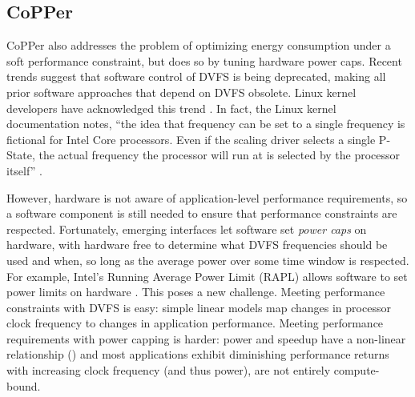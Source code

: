 \subsection{CoPPer}

CoPPer also addresses the problem of optimizing energy consumption under a soft performance constraint, but does so by tuning hardware power caps.
Recent trends suggest that software control of DVFS is being deprecated, making all prior software approaches that depend on DVFS obsolete.
Linux kernel developers have acknowledged this trend \cite{lwn602479}.
In fact, the Linux kernel documentation notes, ``the idea that frequency can be set to a single frequency is fictional for Intel Core processors. Even if the scaling driver selects a single P-State, the actual frequency the processor will run at is selected by the processor itself'' \cite{KernelPstate}.

However, hardware is not aware of application-level performance requirements, so a software component is still needed to ensure that performance constraints are respected.
Fortunately, emerging interfaces let software set \emph{power caps} on hardware, with hardware free to determine what DVFS frequencies should be used and when, so long as the average power over some time window is respected.
For example, Intel's Running Average Power Limit (RAPL) allows software to set power limits on hardware \cite{RAPL}.
This poses a new challenge.
Meeting performance constraints with DVFS is easy: simple linear models map changes in processor clock frequency to changes in application performance.
Meeting performance requirements with power capping is harder: power and speedup have a non-linear relationship () and most applications exhibit diminishing performance returns with increasing clock frequency (and thus power), \ie are not entirely compute-bound.

